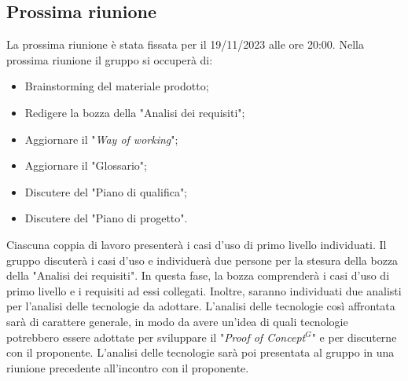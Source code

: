 \subsection{Prossima riunione}
La prossima riunione è stata fissata per il 19/11/2023 alle ore 20:00. Nella
prossima riunione il gruppo si occuperà di:
\begin{itemize}
	\item Brainstorming del materiale prodotto;
	\item Redigere la bozza della "Analisi dei requisiti";
	\item Aggiornare il "\textit{Way of working}";
	\item Aggiornare il "Glossario";
	\item Discutere del "Piano di qualifica";
	\item Discutere del "Piano di progetto".
\end{itemize}

Ciascuna coppia di lavoro presenterà i casi d'uso di primo livello individuati.
Il gruppo discuterà i casi d'uso e individuerà due persone per la stesura della
bozza della "Analisi dei requisiti". In questa fase, la bozza comprenderà i casi
d'uso di primo livello e i requisiti ad essi collegati. Inoltre,
saranno individuati due analisti per l'analisi delle tecnologie da adottare.
L'analisi delle tecnologie così affrontata sarà di carattere generale, in
modo da avere un'idea di quali tecnologie potrebbero essere adottate
per sviluppare il "\textit{\gls{Proof of Concept}$^G$}" e per discuterne con il
proponente. L'analisi delle tecnologie sarà poi presentata al gruppo in
una riunione precedente all'incontro con il proponente.

